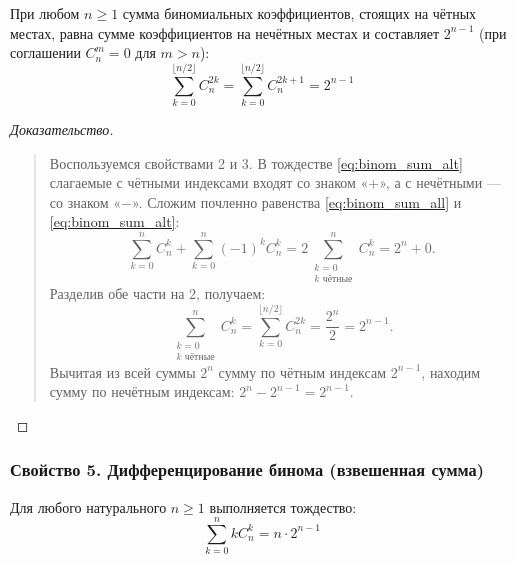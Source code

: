 \begin{proposition}
    При любом $n \ge 1$ сумма биномиальных коэффициентов, стоящих на чётных 
    местах, равна сумме коэффициентов на нечётных местах и составляет 
    $2^{n-1}$ (при соглашении $C_n^m = 0$ для $m > n$):
    \begin{equation} \label{eq:binom_sum_even_odd}
        \sum_{k=0}^{\lfloor n/2 \rfloor} C_n^{2k} = 
        \sum_{k=0}^{\lfloor n/2 \rfloor} C_n^{2k+1} = 2^{n-1} \tag{6}
    \end{equation}
\end{proposition}

\begin{proof}[Доказательство]~\\
    \begin{quote}
        Воспользуемся свойствами 2 и 3. В тождестве \eqref{eq:binom_sum_alt} 
        слагаемые с чётными индексами входят со знаком «$+$», а с 
        нечётными --- со знаком «$-$». Сложим почленно равенства 
        \eqref{eq:binom_sum_all} и \eqref{eq:binom_sum_alt}:
        \[
            \sum_{k=0}^{n} C_n^k + \sum_{k=0}^{n} (-1)^k C_n^k = 
            2 \sum_{\substack{k=0 \\ k \text{ чётные}}}^{n} C_n^k = 2^n + 0.
        \]
        Разделив обе части на $2$, получаем:
        \[
            \sum_{\substack{k=0 \\ k \text{ чётные}}}^{n} C_n^k = 
            \sum_{k=0}^{\lfloor n/2 \rfloor} C_n^{2k} = \frac{2^n}{2} = 2^{n-1}.
        \]
        Вычитая из всей суммы $2^n$ сумму по чётным индексам $2^{n-1}$, 
        находим сумму по нечётным индексам: $2^n - 2^{n-1} = 2^{n-1}$.
    \end{quote}
\end{proof}

\subsubsection{Свойство 5. Дифференцирование бинома (взвешенная сумма)}

\begin{proposition}
    Для любого натурального $n \ge 1$ выполняется тождество:
    \begin{equation} \label{eq:binom_sum_k}
        \sum_{k=0}^{n} k C_n^k = n \cdot 2^{n-1} \tag{7}
    \end{equation}
\end{proposition}

